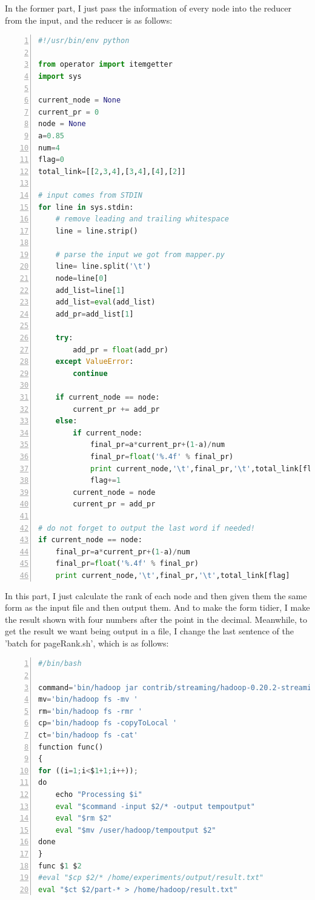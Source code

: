 \documentclass{article}
\begin{document}
In the former part, I just pass the information of every node into the reducer from the input, and the reducer is as follows:
\begin{lstlisting}[language=python,numbers=left,frame=leftline]
#!/usr/bin/env python

from operator import itemgetter
import sys

current_node = None
current_pr = 0
node = None
a=0.85
num=4
flag=0
total_link=[[2,3,4],[3,4],[4],[2]]

# input comes from STDIN
for line in sys.stdin:
    # remove leading and trailing whitespace
    line = line.strip()

    # parse the input we got from mapper.py
    line= line.split('\t')
    node=line[0]
    add_list=line[1]
    add_list=eval(add_list)
    add_pr=add_list[1]

    try:
        add_pr = float(add_pr)
    except ValueError:
        continue

    if current_node == node:
        current_pr += add_pr
    else:
        if current_node:
    	    final_pr=a*current_pr+(1-a)/num
    	    final_pr=float('%.4f' % final_pr)
            print current_node,'\t',final_pr,'\t',total_link[flag]
    	    flag+=1
        current_node = node
        current_pr = add_pr

# do not forget to output the last word if needed!
if current_node == node:
    final_pr=a*current_pr+(1-a)/num
    final_pr=float('%.4f' % final_pr)
    print current_node,'\t',final_pr,'\t',total_link[flag]

\end{lstlisting}
In this part, I just calculate the rank of each node and then given them the same form as the input file and then output them. And to make the form tidier, I make the result shown with four numbers after the point in the decimal. Meanwhile, to get the result we want being output in a file, I change the last sentence of the 'batch for pageRank.sh', which is as follows:
\begin{lstlisting}[language=python,numbers=left,frame=leftline]
#/bin/bash

command='bin/hadoop jar contrib/streaming/hadoop-0.20.2-streaming.jar -file /home/experiments/src/mapper.py -mapper /home/experiments/src/mapper.py -file /home/experiments/src/reducer.py -reducer /home/experiments/src/reducer.py'
mv='bin/hadoop fs -mv '
rm='bin/hadoop fs -rmr '
cp='bin/hadoop fs -copyToLocal '
ct='bin/hadoop fs -cat'
function func()
{
for ((i=1;i<$1+1;i++));
do
    echo "Processing $i"
    eval "$command -input $2/* -output tempoutput"
    eval "$rm $2"
    eval "$mv /user/hadoop/tempoutput $2"
done
}
func $1 $2
#eval "$cp $2/* /home/experiments/output/result.txt"
eval "$ct $2/part-* > /home/hadoop/result.txt"
\end{lstlisting}
\end{document}
